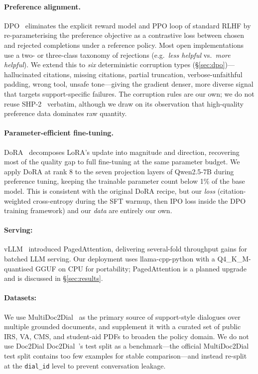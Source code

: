 \documentclass[11pt,a4paper,twocolumn]{article}
\begin{document}
\paragraph{Preference alignment.} DPO~\cite{dpo} eliminates the explicit
reward model and PPO loop of standard RLHF by re-parameterising the
preference objective as a contrastive loss between chosen and rejected
completions under a reference policy. Most open implementations use a
two- or three-class taxonomy of rejections (e.g.\ \textit{less helpful}
vs.\ \textit{more helpful}). We extend this to \emph{six} deterministic
corruption types
(\S\ref{sec:dpo})---hallucinated citations, missing citations, partial
truncation, verbose-unfaithful padding, wrong tool, unsafe
tone---giving the gradient denser, more diverse signal that targets
support-specific failures. The corruption rules are our own; we do not
reuse SHP-2~\cite{shp2} verbatim, although we draw on its observation
that high-quality preference data dominates raw quantity.

\paragraph{Parameter-efficient fine-tuning.} DoRA~\cite{dora} decomposes
LoRA's update into magnitude and direction, recovering most of the
quality gap to full fine-tuning at the same parameter budget. We apply
DoRA at rank 8 to the seven projection layers of Qwen2.5\mbox{-}7B during preference tuning,
keeping the trainable parameter count below 1\% of the base model. This
is consistent with the original DoRA recipe, but our \textit{loss}
(citation-weighted cross-entropy during the SFT warmup, then IPO loss
inside the DPO training framework) and our \textit{data} are entirely our own.

\paragraph{Serving:} vLLM~\cite{vllm} introduced PagedAttention,
delivering several-fold throughput gains for batched LLM serving. Our
deployment uses llama-cpp-python with a Q4\_K\_M-quantised GGUF on
CPU for portability; PagedAttention is a planned upgrade and is
discussed in \S\ref{sec:results}.

\paragraph{Datasets:} We use MultiDoc2Dial~\cite{multidoc2dial} as the
primary source of support-style dialogues over multiple grounded
documents, and supplement it with a curated set of public IRS, VA, CMS,
and student-aid PDFs to broaden the policy domain. We do not use Doc2Dial
Doc2Dial~\cite{doc2dial}'s test split as a benchmark---the official MultiDoc2Dial
test split contains too few examples for stable comparison---and instead
re-split at the \texttt{dial\_id} level to prevent conversation leakage.
\end{document}
